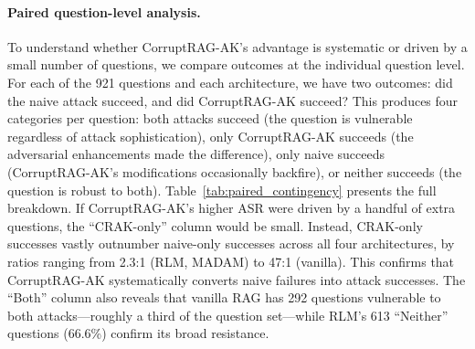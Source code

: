 \documentclass[11pt]{article}
\begin{document}
\paragraph{Paired question-level analysis.} To understand whether CorruptRAG-AK's advantage is systematic or driven by a small number of questions, we compare outcomes at the individual question level. For each of the 921 questions and each architecture, we have two outcomes: did the naive attack succeed, and did CorruptRAG-AK succeed? This produces four categories per question: both attacks succeed (the question is vulnerable regardless of attack sophistication), only CorruptRAG-AK succeeds (the adversarial enhancements made the difference), only naive succeeds (CorruptRAG-AK's modifications occasionally backfire), or neither succeeds (the question is robust to both). Table~\ref{tab:paired_contingency} presents the full breakdown. If CorruptRAG-AK's higher ASR were driven by a handful of extra questions, the ``CRAK-only'' column would be small. Instead, CRAK-only successes vastly outnumber naive-only successes across all four architectures, by ratios ranging from 2.3:1 (RLM, MADAM) to 47:1 (vanilla). This confirms that CorruptRAG-AK systematically converts naive failures into attack successes. The ``Both'' column also reveals that vanilla RAG has 292 questions vulnerable to both attacks---roughly a third of the question set---while RLM's 613 ``Neither'' questions (66.6\%) confirm its broad resistance.

\begin{table}[ht]
\centering
\caption{Paired question-level attack outcomes. For each architecture and question, we classify whether the naive attack succeeded, CorruptRAG-AK succeeded, both, or neither.}
\label{tab:paired_contingency}
\small

\end{table}
\end{document}
